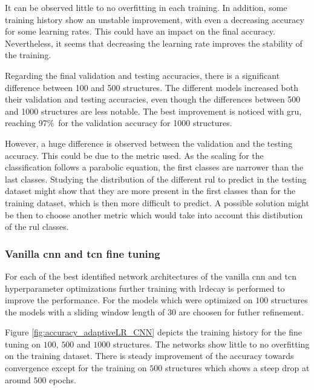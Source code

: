 \documentclass[conference]{IEEEtran}
\begin{document}
It can be observed little to no overfitting in each training. In addition, some training history show an unstable improvement, with even a decreasing accuracy for some learning rates. This could have an impact on the final accuracy. Nevertheless, it seems that decreasing the learning rate improves the stability of the training.

Regarding the final validation and testing accuracies, there is a significant difference between 100 and 500 structures. The different models increased both their validation and testing accuracies, even though the differences between 500 and 1000 structures are less notable. The best improvement is noticed with \gls{gru}, reaching 97\%\ for the validation accuracy for 1000 structures.

However, a huge difference is observed between the validation and the testing accuracy. This could be due to the metric used. As the scaling for the classification follows a parabolic equation, the first classes are narrower than the last classes. Studying the distribution of the different \gls{rul} to predict in the testing dataset might show that they are more present in the first classes than for the training dataset, which is then more difficult to predict. A possible solution might be then to choose another metric which would take into account this distibution of the \gls{rul} classes.


\subsubsection{Vanilla \gls{cnn} and \gls{tcn} fine tuning}

For each of the best identified network architectures of the vanilla \gls{cnn} and \gls{tcn} hyperparameter optimizations further training with \gls{lrdecay} is performed to improve the performance. For the models which were optimized on $ 100 $ structures the models with a sliding window length of $ 30 $ are choosen for futher refinement.

Figure \ref{fig:accuracy_adaptiveLR_CNN} depicts the training history for the fine tuning on $ 100 $, $ 500 $ and $ 1000 $ structures. The networks show little to no overfitting on the training dataset. There is steady improvement of the accuracy towards convergence except for the training on $ 500 $ structures which shows a steep drop at around $ 500 $ epochs.
\end{document}
